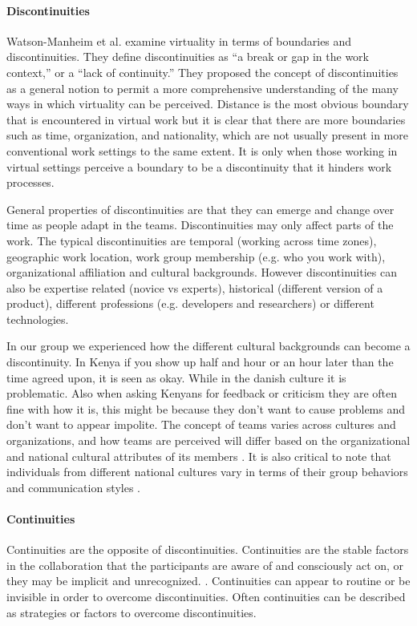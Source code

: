 \paragraph{Discontinuities} \label{par:discontinuities}
Watson-Manheim et al. \cite{watson2007distance} examine virtuality in terms of boundaries and discontinuities. They define discontinuities as “a break or gap in the work context,” or a “lack of continuity.” They proposed the concept of discontinuities as a general notion to permit a more comprehensive understanding of the many ways in which virtuality can be perceived.
Distance is the most obvious boundary that is encountered in virtual work but it is clear that there are more boundaries such as time, organization, and nationality, which are not usually present in more conventional work settings to the same extent. It is only when those working in virtual settings perceive a boundary to be a discontinuity that it hinders work processes. 

General properties of discontinuities are that they can emerge and change over time as people adapt in the teams. Discontinuities may only affect parts of the work. The typical discontinuities are temporal (working across time zones), geographic work location, work group membership (e.g. who you work with), organizational affiliation and cultural backgrounds. However discontinuities can also be expertise related (novice vs experts), historical (different version of a product), different professions (e.g. developers and researchers) or different technologies.

In our group we experienced how the different cultural backgrounds can become a discontinuity. In Kenya if you show up half and hour or an hour later than the time agreed upon, it is seen as okay. While in the danish culture it is problematic. Also when asking Kenyans for feedback or criticism they are often fine with how it is, this might be because they don't want to cause problems and don't want to appear impolite. 
The concept of teams varies across cultures and organizations, and how teams are perceived will differ based on the organizational and national cultural attributes of its members \cite{gibson2001metaphors}. It is also critical to note that individuals from different national cultures vary in terms of their group behaviors and communication styles \cite{gudykunst1997cultural}.

\paragraph{Continuities} \label{par:continuities}
Continuities are the opposite of discontinuities. Continuities are the stable factors in the collaboration that the participants are aware of and consciously act on, or they may be implicit and 
unrecognized. \cite{watson2007distance}. Continuities can appear to routine or be invisible in order to overcome discontinuities. Often continuities can be described as strategies or factors to overcome discontinuities.